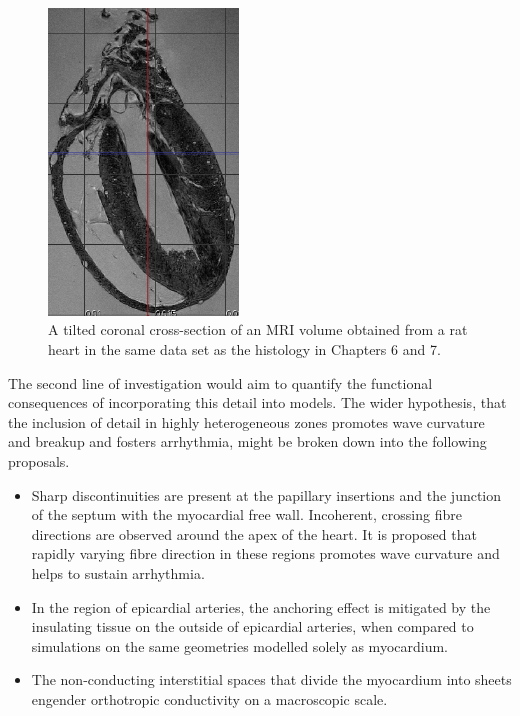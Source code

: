  \begin{figure}[htbp]
   \centering
   \includegraphics[width=0.45\textwidth]{Ch8/Figs/MRI}
   \caption{A tilted coronal cross-section of an MRI volume obtained from a rat heart in the same data set as the histology in Chapters 6 and 7.}
   \label{fig:MRI}
 \end{figure}
 
  The second line of investigation would aim to quantify the functional consequences of incorporating this detail into models. The wider hypothesis, that the inclusion of detail in highly heterogeneous zones promotes wave curvature and breakup and fosters arrhythmia, might be broken down into the following proposals.
  \begin{itemize}
    \item Sharp discontinuities are present at the papillary insertions and the junction of the septum with the myocardial free wall. Incoherent, crossing fibre directions are observed around the apex of the heart. It is proposed that rapidly varying fibre direction in these regions promotes wave curvature and helps to sustain arrhythmia.
    \item In the region of epicardial arteries, the anchoring effect is mitigated by the insulating tissue on the outside of epicardial arteries, when compared to simulations on the same geometries modelled solely as myocardium.
    \item The non-conducting interstitial spaces that divide the myocardium into sheets engender orthotropic conductivity on a macroscopic scale.
  \end{itemize}
  
